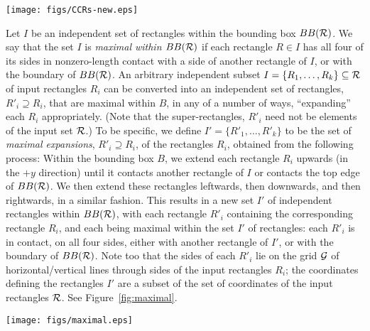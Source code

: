 \documentclass{article}
\newcommand{\B}{BB({\cal R})}
\begin{document}
\begin{figure*}[!ht]
	\centering
	\texttt{[image: figs/CCRs-new.eps]}
	\caption{Examples of CCRs: Left: A rectangle with sides labeled (left $\ell$, right $r$, top $t$, and bottom $b$).
          Middle: An L-shaped CCR.
          Right: A general CCR with four clipped corners and 12 sides.}
	\label{fig:CCR}
\end{figure*}

\medskip
{}\quad
Let $I$ be an independent set of
rectangles within the bounding box $\B$.
%
We say that the set $I$ is {\em maximal within $\B$} if each rectangle
$R \in I$ has all four of its sides in nonzero-length contact with a side of another
rectangle of $I$, or with the boundary of $\B$.
%
An arbitrary independent subset $I=\{R_1,\ldots,R_k\}\subseteq {\cal
  R}$ of input rectangles $R_i$ can be converted into an independent
set of rectangles, $R'_i\supseteq R_i$, that are maximal within $B$,
in any of a number of ways, ``expanding'' each $R_i$
appropriately. (Note that the super-rectangles, $R'_i$ need not be
elements of the input set ${\cal R}$.)
%
To be specific, we define $I'=\{R'_1,\ldots,R'_k\}$ to be the set of
{\em maximal expansions}, $R'_i\supseteq R_i$, of the rectangles
$R_i$, obtained from the following process: Within the bounding box
$B$, we extend each rectangle $R_i$ upwards (in the $+y$ direction)
until it contacts another rectangle of $I$ or contacts the top edge of
$\B$. We then extend these rectangles leftwards, then downwards, and
then rightwards, in a similar fashion.  This results in a new set $I'$
of independent rectangles within $\B$, with each rectangle $R'_i$
containing the corresponding rectangle $R_i$, and each being maximal
within the set $I'$ of rectangles: each $R'_i$ is in contact, on all
four sides, either with another rectangle of $I'$, or with the
boundary of $\B$.  Note too that the sides of each $R'_i$ lie on the
grid ${\cal G}$ of horizontal/vertical lines through sides of the
input rectangles $R_i$; the coordinates defining the rectangles $I'$
are a subset of the set of coordinates of the input rectangles ${\cal R}$.
%
%
See Figure~\ref{fig:maximal}.

\begin{figure*}[!ht]
	\centering
	\texttt{[image: figs/maximal.eps]}
	\caption{Example of the maximal expansions $R'_i$ (in light red) of
          a set $I$ of independent rectangles $R_i$ (in magenta).}
	\label{fig:maximal}
\end{figure*}
\end{document}
